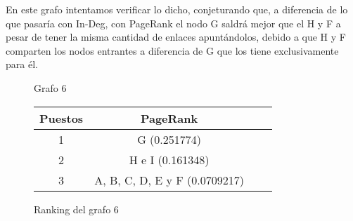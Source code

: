 En este grafo intentamos verificar lo dicho, conjeturando que, a diferencia de lo que pasaría con In-Deg, con PageRank el nodo G saldrá mejor que el H y F a pesar de tener la misma cantidad de enlaces apuntándolos, debido a que H y F comparten los nodos entrantes a diferencia de G que los tiene exclusivamente para él.
\begin{figure}[H]
\centering
{}
  \caption{\footnotesize{ Grafo 6 }}
  \label{fig:Rankings}
\end{figure}

\begin{figure}[H]
\centering
\begin{tabular}{| c | c | c | c |}
  \hline
  Puestos & PageRank\\ \hline \hline
  1 & G (0.251774)\\ \hline
  2 & H e I (0.161348)\\ \hline
  3 & A, B, C, D, E y F (0.0709217)\\ \hline
\end{tabular}
  \caption{\footnotesize{Ranking del grafo 6}}
  \label{fig:Rankings}
\end{figure}

